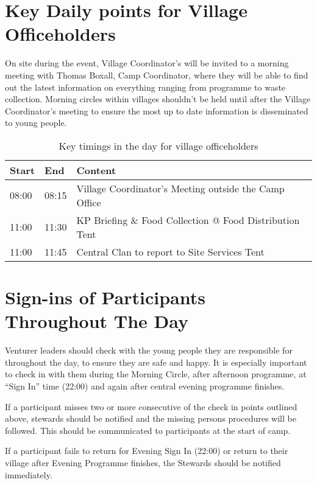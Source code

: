 \documentclass[a4paper, 11pt]{report}
\begin{document}
\section{Key Daily points for Village Officeholders}
On site during the event, Village Coordinator's will be invited to a morning meeting with Thomas Boxall, Camp Coordinator, where they will be able to find out the latest information on everything ranging from programme to waste collection. Morning circles within villages shouldn't be held until after the Village Coordinator's meeting to ensure the most up to date information is disseminated to young people. 
\begin{table}[H]
    \centering
    {\RaggedRight
    \begin{tabular}{p{} p{} p{}}
        \textbf{Start} & \textbf{End} & \textbf{Content} \\
        \hline
        08:00 & 08:15 & Village Coordinator's Meeting outside the Camp Office \\
        \hline
        11:00 & 11:30 & KP Briefing \& Food Collection @ Food Distribution Tent \\
        \hline
        11:00 & 11:45 & Central Clan to report to Site Services Tent\\
        \hline
    \end{tabular}
    }%
    \caption{Key timings in the day for village officeholders}
\end{table}

\section{Sign-ins of Participants Throughout The Day}
Venturer leaders should check with the young people they are responsible for throughout the day, to ensure they are safe and happy. It is especially important to check in with them during the Morning Circle, after afternoon programme, at ``Sign In'' time (22:00) and again after central evening programme finishes. \nl

If a participant misses two or more consecutive of the check in points outlined above, stewards should be notified and the missing persons procedures will be followed. This should be communicated to participants at the start of camp.\nl

If a participant fails to return for Evening Sign In (22:00) or return to their village after Evening Programme finishes, the Stewards should be notified immediately. 
\end{document}
